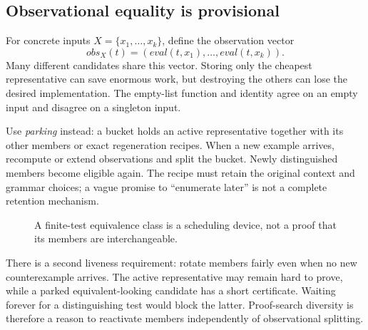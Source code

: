 \subsection{Observational equality is provisional}
For concrete inputs $X=\{x_1,\ldots,x_k\}$, define the observation vector
\[
 \mathit{obs}_X(t)=
 (\mathit{eval}(t,x_1),\ldots,\mathit{eval}(t,x_k)).
\]
Many different candidates share this vector. Storing only the cheapest representative can save enormous work, but destroying the others can lose the desired implementation. The empty-list function and identity agree on an empty input and disagree on a singleton input.

Use \emph{parking} instead: a bucket holds an active representative together with its other members or exact regeneration recipes. When a new example arrives, recompute or extend observations and split the bucket. Newly distinguished members become eligible again. The recipe must retain the original context and grammar choices; a vague promise to ``enumerate later'' is not a complete retention mechanism.

\begin{figure}[ht]
\centering
{}
\caption{A finite-test equivalence class is a scheduling device, not a proof that its members are interchangeable.}
\end{figure}

There is a second liveness requirement: rotate members fairly even when no new counterexample arrives. The active representative may remain hard to prove, while a parked equivalent-looking candidate has a short certificate. Waiting forever for a distinguishing test would block the latter. Proof-search diversity is therefore a reason to reactivate members independently of observational splitting.

